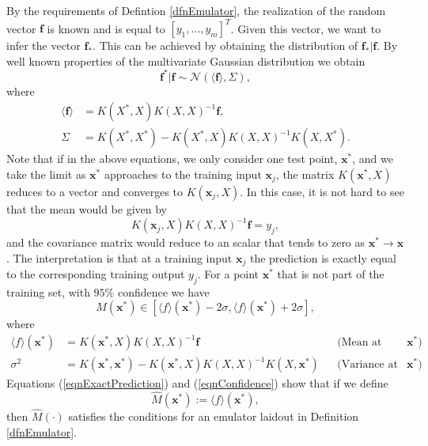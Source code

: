 \documentclass[12pt]{book}
\newcommand{\x}{\textbf{x}}
\begin{document}
By the requirements of Defintion \ref{dfnEmulator},
 the realization of the random vector $\textbf{f}$ is known and is equal to $[y_{1},\ldots,y_{m}]^{T}$.  
Given this vector, we want to  infer  the vector $\textbf{f}_{*}$.
This can be achieved by obtaining the distribution of $\textbf{f}_{*}|\textbf{f}$. By well known properties
of the multivariate Gaussian distribution we  obtain  \cite{lifshits2013gaussian}
\begin{equation}\label{eqnformulameancovariance}
\textbf{f}^{*}|\textbf{f}\sim\mathscr{N}(\langle\textbf{f}\rangle,\Sigma),
\end{equation}
where
\begin{align*}
\langle\textbf{f}\rangle&=K(X^{*},X)K(X,X)^{-1}\textbf{f},\\
\Sigma&=K(X^{*},X^{*})-K(X^{*},X)K(X,X)^{-1}K(X,X^{*}).
\end{align*}
Note that  if in the above equations, we only consider one  test point, $\x^{*}$, and
we take the limit as $\x^{*}$ approaches  to the training input $\x_{j}$,
 the matrix
$K(\x^{*},X)$ reduces to a vector and  converges to  $K(\x_{j},X)$. In this case, it is not hard 
to see that the mean
would be given by 
\begin{equation}\label{eqnExactPrediction}
K(\x_{j},X)K(X,X)^{-1}\textbf{f}=y_{j},
\end{equation} 
and the covariance matrix would 
reduce to an scalar  that tends to zero as $\x^{*}\rightarrow \x$. The interpretation is that 
at a training input $\x_{j}$ the prediction is exactly equal to the  corresponding training output $y_{j}$. 
For a point $\textbf{x}^{*}$ that is not part of the training set, with $95\%$ confidence we have
\begin{equation}\label{eqnConfidence}
M(\x^{*})\in [\langle f \rangle(\x^{*})-2\sigma,\langle f\rangle(\x^{*})+2\sigma],
\end{equation}
where
\begin{align*}
\langle f\rangle(\x^{*})&=K(\textbf{x}^{*},X)K(X,X)^{-1}\textbf{f}&&\text{(Mean at point $\x^{*}$)}  \\
\sigma^{2}&=K(\textbf{x}^{*},\textbf{x}^{*})-
K(\textbf{x}^{*},X)K(X,X)^{-1}K(X,\textbf{x}^{*}) &&\text{(Variance at point $\x^{*}$)}.
\end{align*}
Equations (\ref{eqnExactPrediction}) and (\ref{eqnConfidence})  show that if we define 
\begin{equation}\label{eqnDefEmulator}
\widehat{M}(\x^{*}):=\langle f\rangle(\x^{*}), 
\end{equation}
then $\widehat{M}(\cdot)$ satisfies the 
conditions for an emulator laidout in Definition \ref{dfnEmulator}.
\end{document}
